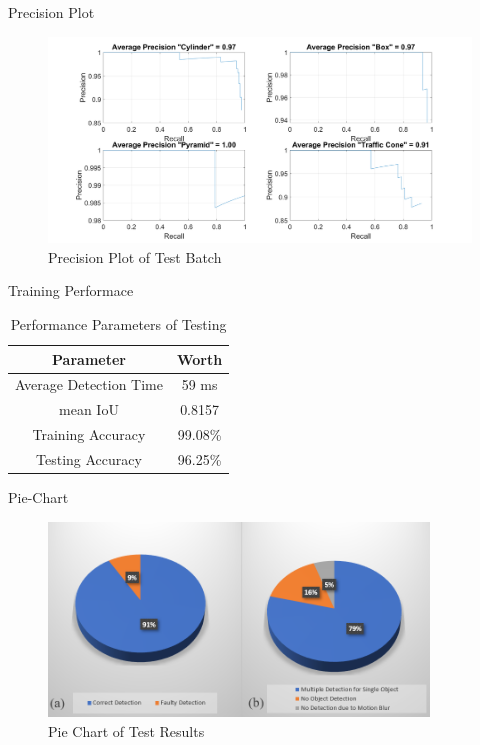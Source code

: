 \documentclass[10pt]{beamer}
\begin{document}
\begin{frame}{Precision Plot}
\begin{figure}
    \centering
    \includegraphics[width=1\textwidth]{Images/Precision_plot.png}
    \caption{Precision Plot of Test Batch}
\end{figure}
\end{frame}

\begin{frame}{Training Performace}
\begin{table}[b]
    \centering
    \begin{tabular}{|c|c|}
        \hline
        \textbf{Parameter} & \textbf{Worth} \\
        \hline
        Average Detection Time & 59 ms\\
        \hline
        mean IoU & 0.8157\\
        \hline
        Training Accuracy & 99.08\% \\
        \hline
        Testing Accuracy & 96.25\% \\
        \hline  
    \end{tabular}
    \caption{Performance Parameters of Testing}
\end{table}
\end{frame}

\begin{frame}{Pie-Chart}
\begin{figure}
    \centering
    \includegraphics[width=0.9\textwidth]{Images/piechart.png}
    \caption{Pie Chart of Test Results}
\end{figure}
\end{frame}
\end{document}
